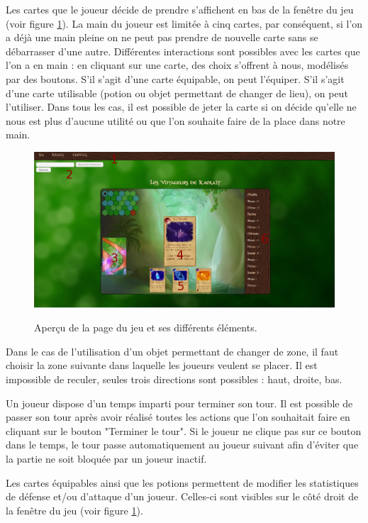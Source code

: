\documentclass[12pt]{report}
\begin{document}
  Les cartes que le joueur décide de prendre s'affichent en bas de la fenêtre du jeu (voir figure \ref{fig:manual}). La main du joueur est limitée à cinq cartes, par conséquent, si l'on a déjà une main pleine on ne peut pas prendre de nouvelle carte sans se débarrasser d'une autre. Différentes interactions sont possibles avec les cartes que l'on a en main : en cliquant sur une carte, des choix s'offrent à nous, modélisés par des boutons. S'il s'agit d'une carte équipable, on peut l'équiper. S'il s'agit d'une carte utilisable (potion ou objet permettant de changer de lieu), on peut l'utiliser. Dans tous les cas, il est possible de jeter la carte si on décide qu'elle ne nous est plus d'aucune utilité ou que l'on souhaite faire de la place dans notre main.

	\begin{figure}[h!]
		\centering
		\includegraphics[scale=0.35]{manual}
		\label{fig:manual}
		\caption{Aperçu de la page du jeu et ses différents éléments.}
	\end{figure}

  Dans le cas de l'utilisation d'un objet permettant de changer de zone, il faut choisir la zone suivante dans laquelle les joueurs veulent se placer. Il est impossible de reculer, seules trois directions sont possibles : haut, droite, bas.

  Un joueur dispose d'un temps imparti pour terminer son tour. Il est possible de passer son tour après avoir réalisé toutes les actions que l'on souhaitait faire en cliquant sur le bouton "Terminer le tour". Si le joueur ne clique pas sur ce bouton dans le temps, le tour passe automatiquement au joueur suivant afin d'éviter que la partie ne soit bloquée par un joueur inactif.

  Les cartes équipables ainsi que les potions permettent de modifier les statistiques de défense et/ou d'attaque d'un joueur. Celles-ci sont visibles sur le côté droit de la fenêtre du jeu (voir figure \ref{fig:manual}).
\end{document}
